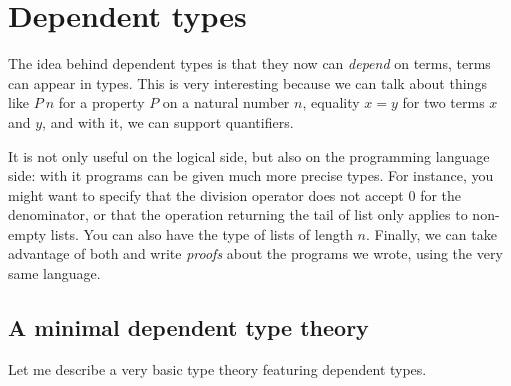 \chapter{Dependent types}

The idea behind dependent types is that they now can \emph{depend} on terms,
\ie terms can appear in types.
This is very interesting because we can talk about things like \(P\ n\) for a
property \(P\) on a natural number \(n\), equality \(x = y\) for two terms \(x\)
and \(y\), and with it, we can support quantifiers.

It is not only useful on the logical side, but also on the programming language
side: with it programs can be given much more precise types.
For instance, you might want to specify that the division operator does not
accept \(0\) for the denominator, or that the operation returning the tail of
list only applies to non-empty lists.
You can also have the type of lists of length \(n\).
Finally, we can take advantage of both and write \emph{proofs} about the
programs we wrote, using the very same language.

\section{A minimal dependent type theory}

Let me describe a very basic type theory featuring dependent types.


